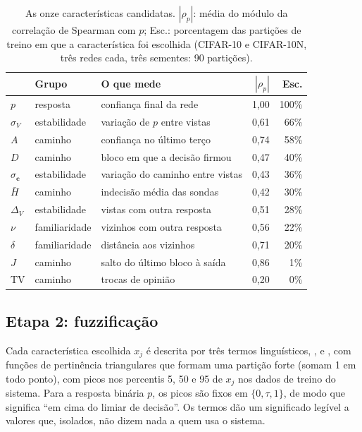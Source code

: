 \begin{table}[t]
\centering
\caption{As onze características candidatas. $|\rho_p|$: média do módulo da correlação de Spearman com $p$;
Esc.: porcentagem das partições de treino em que a característica foi escolhida
(CIFAR-10 e CIFAR-10N, três redes cada, três sementes: 90 partições).}
\label{tab:features}
\footnotesize
\setlength{\tabcolsep}{3pt}
\begin{tabular}{@{}llp{3.1cm}rr@{}}
\toprule
 & Grupo & O que mede & $|\rho_p|$ & Esc. \\
\midrule
$p$ & resposta & confiança final da rede & 1,00 & 100\% \\
$\sigma_V$ & estabilidade & variação de $p$ entre vistas & 0,61 & 66\% \\
$A$ & caminho & confiança no último terço & 0,74 & 58\% \\
$D$ & caminho & bloco em que a decisão firmou & 0,47 & 40\% \\
$\sigma_{\mathbf c}$ & estabilidade & variação do caminho entre vistas & 0,43 & 36\% \\
$\bar H$ & caminho & indecisão média das sondas & 0,42 & 30\% \\
$\Delta_V$ & estabilidade & vistas com outra resposta & 0,51 & 28\% \\
$\nu$ & familiaridade & vizinhos com outra resposta & 0,56 & 22\% \\
$\delta$ & familiaridade & distância aos vizinhos & 0,71 & 20\% \\
$J$ & caminho & salto do último bloco à saída & 0,86 & 1\% \\
$\mathrm{TV}$ & caminho & trocas de opinião & 0,20 & 0\% \\
\bottomrule
\end{tabular}
\end{table}

\subsection{Etapa 2: fuzzificação}
Cada característica escolhida $x_j$ é descrita por três termos linguísticos, ,  e , com funções de
pertinência triangulares que formam uma partição forte (somam 1 em todo ponto), com picos nos percentis 5, 50 e 95 de $x_j$ nos dados de
treino do sistema. Para a resposta binária $p$, os picos são fixos em $\{0, \tau, 1\}$, de modo que  significa ``em cima do
limiar de decisão''. Os termos dão um significado legível a valores que, isolados, não dizem nada a quem usa o sistema.

